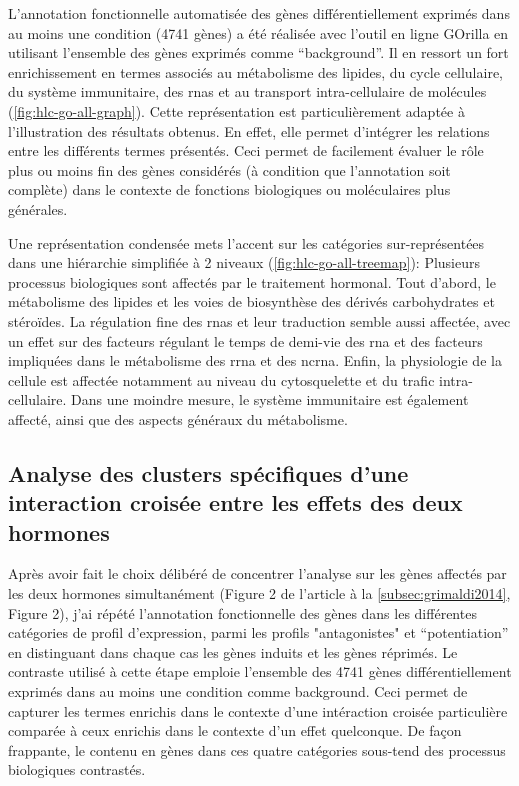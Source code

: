 \documentclass[../main.tex]{subfiles}
\begin{document}
		

		L'annotation fonctionnelle automatisée des gènes différentiellement exprimés dans au moins une condition (4741 gènes) a été réalisée avec l'outil en ligne GOrilla en utilisant l'ensemble des gènes exprimés comme ``background''.
		Il en ressort un fort enrichissement en termes associés au métabolisme des lipides, du cycle cellulaire, du système immunitaire, des \glspl{rna} et au transport intra-cellulaire de molécules (\autoref{fig:hlc-go-all-graph}).
		Cette représentation est particulièrement adaptée à l'illustration des résultats obtenus.
		En effet, elle permet d'intégrer les relations entre les différents termes présentés.
		Ceci permet de facilement évaluer le rôle plus ou moins fin des gènes considérés (à condition que l'annotation soit complète) dans le contexte de fonctions biologiques ou moléculaires plus générales.

		

		Une représentation condensée mets l'accent sur les catégories sur-représentées dans une hiérarchie simplifiée à 2 niveaux (\autoref{fig:hlc-go-all-treemap}):
		Plusieurs processus biologiques sont affectés par le traitement hormonal.
		Tout d'abord, le métabolisme des lipides et les voies de biosynthèse des dérivés carbohydrates et stéroïdes.
		La régulation fine des \glspl{rna} et leur traduction semble aussi affectée, avec un effet sur des facteurs régulant le temps de demi-vie des \gls{rna} et des facteurs impliquées dans le métabolisme des \gls{rrna} et des \gls{ncrna}.
		Enfin, la physiologie de la cellule est affectée notamment au niveau du cytosquelette et du trafic intra-cellulaire.
		Dans une moindre mesure, le système immunitaire est également affecté, ainsi que des aspects généraux du métabolisme.

		


	\subsection{Analyse des clusters spécifiques d'une interaction croisée entre les effets des deux hormones}
		Après avoir fait le choix délibéré de concentrer l'analyse sur les gènes affectés par les deux hormones simultanément (Figure 2 de l'article à la \autoref{subsec:grimaldi2014}, Figure 2), j'ai répété l'annotation fonctionnelle des gènes dans les différentes catégories de profil d'expression, parmi les profils "antagonistes" et ``potentiation'' en distinguant dans chaque cas les gènes induits et les gènes réprimés.
		Le contraste utilisé à cette étape emploie l'ensemble des 4741 gènes différentiellement exprimés dans au moins une condition comme background.
		Ceci permet de capturer les termes enrichis dans le contexte d'une intéraction croisée particulière comparée à ceux enrichis dans le contexte d'un effet quelconque.
		De façon frappante, le contenu en gènes dans ces quatre catégories sous-tend des processus biologiques contrastés.
\end{document}
